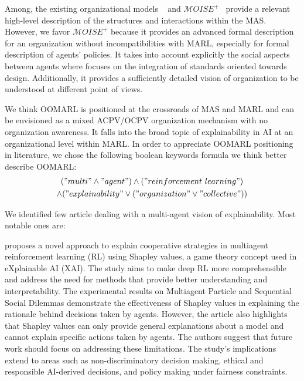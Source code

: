 \documentclass[runningheads]{llncs}
\begin{document}
Among, the existing organizational models ~\cite{Ferber2004} and $\mathcal{M}OISE^+$~\cite{Hubner2002} provide a relevant high-level description of the structures and interactions within the MAS. However, we favor $\mathcal{M}OISE^+$ because it provides an advanced formal description for an organization without incompatibilities with MARL, especially for formal description of agents' policies. It takes into account explicitly the social aspects between agents where  focuses on the integration of standards oriented towards design. Additionally, it provides a sufficiently detailed vision of organization to be understood at different point of views.

We think OOMARL is positioned at the crossroads of MAS and MARL and can be envisioned as a mixed ACPV/OCPV organization mechanism with no organization awareness. It falls into the broad topic of explainability in AI at an organizational level within MARL. In order to appreciate OOMARL positioning in literature, we chose the following boolean keywords formula we think better describe OOMARL:
\begin{gather*}
    ("multi" \land "agent") \land ("reinforcement \ learning")\\ \land ("explainability" \lor ("organization" \lor "collective"))
\end{gather*}

We identified few article dealing with a multi-agent vision of explainability. Most notable ones are:

\cite{Heuillet2022} proposes a novel approach to explain cooperative strategies in multiagent reinforcement learning (RL) using Shapley values, a game theory concept used in eXplainable AI (XAI). The study aims to make deep RL more comprehensible and address the need for methods that provide better understanding and interpretability. The experimental results on Multiagent Particle and Sequential Social Dilemmas demonstrate the effectiveness of Shapley values in explaining the rationale behind decisions taken by agents. However, the article also highlights that Shapley values can only provide general explanations about a model and cannot explain specific actions taken by agents. The authors suggest that future work should focus on addressing these limitations. The study's implications extend to areas such as non-discriminatory decision making, ethical and responsible AI-derived decisions, and policy making under fairness constraints.
\end{document}

